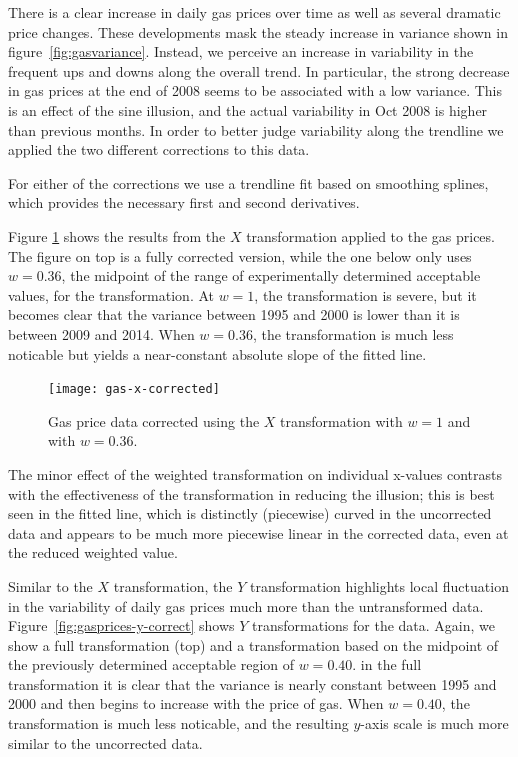 \documentclass[11pt]{isuthesis}\usepackage[]{graphicx}\usepackage[]{color}
\begin{document}
There is a clear increase in daily gas prices over time as well as several dramatic price changes. These developments mask the steady increase in variance shown in figure~\ref{fig:gasvariance}. Instead, we perceive an increase in variability in the frequent ups and downs along the overall trend. In particular, the strong decrease in gas prices at the end of 2008 seems to be associated with a low variance. This is an effect of the sine illusion, and the actual variability in Oct 2008 is higher than previous months. In order to better judge variability along the trendline we applied the two different corrections to this data. 

For either of the corrections we use a trendline fit based on smoothing splines, which provides the necessary first and second derivatives.




Figure \ref{fig:gasprices-x-correct} shows the results from the $X$ transformation applied to the gas prices. The figure on top is a fully corrected version, while the one below only uses $w=0.36$, the midpoint of the range of experimentally determined acceptable values,  for the transformation. At $w=1$, the transformation is severe, but it becomes clear that the variance between 1995 and 2000 is lower than it is between 2009 and 2014. When $w=0.36$, the transformation is much less noticable but yields a near-constant absolute slope of the fitted line.

\begin{figure}
\centering
\texttt{[image: gas-x-corrected]}
\caption[Gas price data, X transformation]{Gas price data corrected using the $X$ transformation with $w=1$ and with $w=0.36$. }
\label{fig:gasprices-x-correct}
\end{figure}
The minor effect of the weighted transformation on individual x-values contrasts with the effectiveness of the transformation in reducing the illusion; this is best seen in the fitted line, which is distinctly (piecewise) curved in the uncorrected data and appears to be much more piecewise linear in the corrected data, even at the reduced weighted value. 

Similar to the $X$ transformation, the $Y$ transformation highlights local fluctuation in the variability of daily gas prices much more than the untransformed data. Figure~\ref{fig:gasprices-y-correct} shows $Y$ transformations for the data. Again, we show a full transformation (top) and a transformation based on the midpoint of the previously determined acceptable region of $w=0.40$.
in the full transformation  it is clear that the variance is nearly constant between 1995 and 2000 and then begins to increase with the price of gas. When $w=0.40$, the transformation is much less noticable, and the resulting $y$-axis scale is much more similar to the uncorrected data. 
\end{document}
